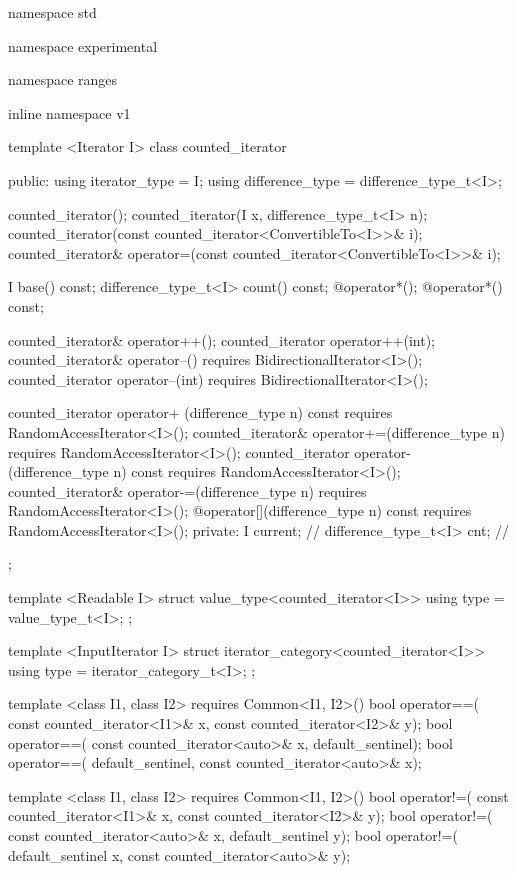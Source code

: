 %
\begin{codeblock}
namespace std { namespace experimental { namespace ranges { inline namespace v1 {
  template <Iterator I>
  class counted_iterator {
  public:
    using iterator_type = I;
    using difference_type = difference_type_t<I>;

    counted_iterator();
    counted_iterator(I x, difference_type_t<I> n);
    counted_iterator(const counted_iterator<ConvertibleTo<I>>& i);
    counted_iterator& operator=(const counted_iterator<ConvertibleTo<I>>& i);

    I base() const;
    difference_type_t<I> count() const;
    @\seebelow@ operator*();
    @\seebelow@ operator*() const;

    counted_iterator& operator++();
    counted_iterator operator++(int);
    counted_iterator& operator--()
      requires BidirectionalIterator<I>();
    counted_iterator operator--(int)
      requires BidirectionalIterator<I>();

    counted_iterator  operator+ (difference_type n) const
      requires RandomAccessIterator<I>();
    counted_iterator& operator+=(difference_type n)
      requires RandomAccessIterator<I>();
    counted_iterator  operator- (difference_type n) const
      requires RandomAccessIterator<I>();
    counted_iterator& operator-=(difference_type n)
      requires RandomAccessIterator<I>();
    @\seebelow@ operator[](difference_type n) const
      requires RandomAccessIterator<I>();
  private:
    I current; // \expos
    difference_type_t<I> cnt; // \expos
  };

  template <Readable I>
  struct value_type<counted_iterator<I>> {
    using type = value_type_t<I>;
  };

  template <InputIterator I>
  struct iterator_category<counted_iterator<I>> {
    using type = iterator_category_t<I>;
  };

  template <class I1, class I2>
      requires Common<I1, I2>()
    bool operator==(
      const counted_iterator<I1>& x, const counted_iterator<I2>& y);
    bool operator==(
      const counted_iterator<auto>& x, default_sentinel);
    bool operator==(
      default_sentinel, const counted_iterator<auto>& x);

  template <class I1, class I2>
      requires Common<I1, I2>()
    bool operator!=(
      const counted_iterator<I1>& x, const counted_iterator<I2>& y);
    bool operator!=(
      const counted_iterator<auto>& x, default_sentinel y);
    bool operator!=(
      default_sentinel x, const counted_iterator<auto>& y);

}}}}
\end{codeblock}
